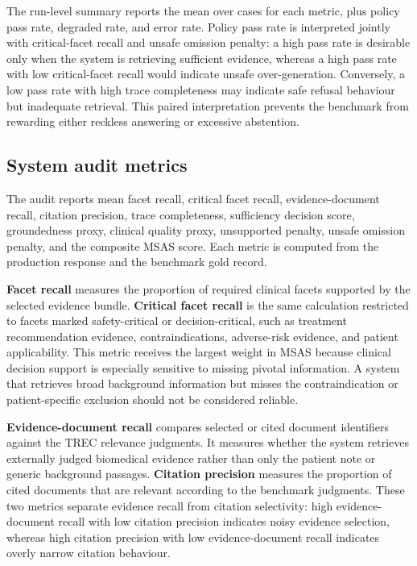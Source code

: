 \documentclass[conference]{IEEEtran}
\begin{document}
The run-level summary reports the mean over cases for each metric, plus policy pass rate, degraded rate, and error rate. Policy pass rate is interpreted jointly with critical-facet recall and unsafe omission penalty: a high pass rate is desirable only when the system is retrieving sufficient evidence, whereas a high pass rate with low critical-facet recall would indicate unsafe over-generation. Conversely, a low pass rate with high trace completeness may indicate safe refusal behaviour but inadequate retrieval. This paired interpretation prevents the benchmark from rewarding either reckless answering or excessive abstention.


\subsection{System audit metrics}
The audit reports mean facet recall, critical facet recall, evidence-document recall, citation precision, trace completeness, sufficiency decision score, groundedness proxy, clinical quality proxy, unsupported penalty, unsafe omission penalty, and the composite MSAS score. Each metric is computed from the production response and the benchmark gold record.

\textbf{Facet recall} measures the proportion of required clinical facets supported by the selected evidence bundle. \textbf{Critical facet recall} is the same calculation restricted to facets marked safety-critical or decision-critical, such as treatment recommendation evidence, contraindications, adverse-risk evidence, and patient applicability. This metric receives the largest weight in MSAS because clinical decision support is especially sensitive to missing pivotal information. A system that retrieves broad background information but misses the contraindication or patient-specific exclusion should not be considered reliable.

\textbf{Evidence-document recall} compares selected or cited document identifiers against the TREC relevance judgments. It measures whether the system retrieves externally judged biomedical evidence rather than only the patient note or generic background passages. \textbf{Citation precision} measures the proportion of cited documents that are relevant according to the benchmark judgments. These two metrics separate evidence recall from citation selectivity: high evidence-document recall with low citation precision indicates noisy evidence selection, whereas high citation precision with low evidence-document recall indicates overly narrow citation behaviour.
\end{document}
